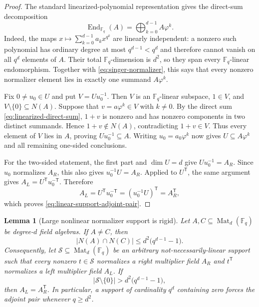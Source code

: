 \documentclass[11pt]{article}
\newtheorem{lemma}[lemma]{Lemma}
\newcommand{\F}{\mathbb F}
\newcommand{\Mat}{\operatorname{Mat}}
\newcommand{\transpose}{\mathsf T}
\begin{document}
\begin{proof}
The standard linearized-polynomial representation gives the direct-sum
decomposition
\begin{equation}
 \operatorname{End}_{\F_q}(A)
   =\bigoplus_{k=0}^{d-1}A\varphi^k.                \label{eq:linearized-direct-sum}
\end{equation}
Indeed, the maps $x\mapsto\sum_{k=0}^{d-1}a_kx^{q^k}$ are linearly
independent: a nonzero such polynomial has ordinary degree at most
$q^{d-1}<q^d$ and therefore cannot vanish on all $q^d$ elements of $A$.
Their total $\F_q$-dimension is $d^2$, so they span every $\F_q$-linear
endomorphism.  Together with \eqref{eq:singer-normalizer}, this says that
every nonzero normalizer element lies in exactly one summand
$A\varphi^k$.

Fix $0\ne u_0\in U$ and put $V=Uu_0^{-1}$.  Then $V$ is an
$\F_q$-linear subspace, $1\in V$, and
$V\setminus\{0\}\subseteq N(A)$.  Suppose that
$v=a\varphi^k\in V$ with $k\ne0$.  By the direct sum
\eqref{eq:linearized-direct-sum}, $1+v$ is nonzero and has nonzero
components in two distinct summands.  Hence $1+v\notin N(A)$, contradicting
$1+v\in V$.  Thus every element of $V$ lies in $A$, proving
$Uu_0^{-1}\subseteq A$.  Writing $u_0=a_0\varphi^k$ now gives
$U\subseteq A\varphi^k$ and all remaining one-sided conclusions.

For the two-sided statement, the first part and $\dim U=d$ give
$Uu_0^{-1}=A_R$.  Since $u_0$ normalizes $A_R$, this also gives
$u_0^{-1}U=A_R$.  Applied to $U^\transpose$, the same argument gives
$A_L=U^\transpose u_0^{-\transpose}$.  Therefore
\[
 A_L=U^\transpose u_0^{-\transpose}
     =(u_0^{-1}U)^\transpose=A_R^\transpose,
\]
which proves \eqref{eq:linear-support-adjoint-pair}.
\end{proof}

\begin{lemma}[Large nonlinear normalizer support is rigid]
\label{lem:large-normalizer-intersection}
Let $A,C\subseteq\Mat_d(\F_q)$ be degree-$d$ field algebras.  If
$A\ne C$, then
\begin{equation}
 |N(A)\cap N(C)|
 \le d^2\bigl(q^{d-1}-1\bigr).                    \label{eq:normalizer-intersection-bound}
\end{equation}
Consequently, let $\mathcal S\subseteq\Mat_d(\F_q)$ be an arbitrary
not-necessarily-linear support such that every nonzero $t\in\mathcal S$
normalizes a right multiplier field $A_R$ and $t^\transpose$ normalizes a
left multiplier field $A_L$.  If
\begin{equation}
 |\mathcal S\setminus\{0\}|>
 d^2\bigl(q^{d-1}-1\bigr),                         \label{eq:large-support-threshold}
\end{equation}
then $A_L=A_R^\transpose$.  In particular, a support of cardinality $q^d$
containing zero forces the adjoint pair whenever $q\ge d^2$.
\end{lemma}
\end{document}
